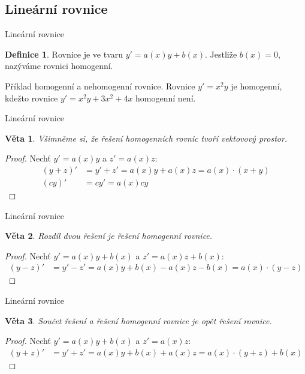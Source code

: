 \documentclass{beamer}
\newtheorem{thm}{Věta}
\theoremstyle{definition}
\newtheorem{dfn}{Definice}
\theoremstyle{example}
\begin{document}
\subsection{Lineární rovnice}
\begin{frame}{Lineární rovnice}
	\begin{dfn}
	Rovnice je ve tvaru $y' = a(x)y + b(x)$. Jestliže $b(x) = 0$, nazýváme rovnici homogenní.
	\end{dfn}
	\begin{exampleblock}{Příklad homogenní a nehomogenní rovnice.}
		Rovnice $y' = x^2y$ je homogenní, kdežto rovnice $y' = x^2y + 3x^2 + 4x$ homogenní není.
	\end{exampleblock}
\end{frame}

\begin{frame}{Lineární rovnice}
	\begin{thm}
		Všimněme si, že řešení homogenních rovnic tvoří vektovový prostor.
	\end{thm}
	\begin{proof}
		Nechť $y' = a(x)y$ a $z' = a(x)z$:
		\begin{align*}
			(y + z)' &= y' + z' = a(x)y + a(x)z = a(x) \cdot (x + y)\\
			(cy)' &= cy' = a(x)cy
		\end{align*}
	\end{proof}
\end{frame}


\begin{frame}{Lineární rovnice}
	\begin{thm}
		Rozdíl dvou řešení je řešení homogenní rovnice.
	\end{thm}
	\begin{proof}
		Nechť $y' = a(x)y + b(x)$ a $z' = a(x)z + b(x)$:
		\begin{align*}
			(y - z)' &= y' - z' = a(x)y + b(x) - a(x)z - b(x) = a(x) \cdot (y - z)
		\end{align*}
	\end{proof}
\end{frame}

\begin{frame}{Lineární rovnice}
	\begin{thm}
		Součet řešení a řešení homogenní rovnice je opět řešení rovnice.
	\end{thm}
	\begin{proof}
		Nechť $y' = a(x)y + b(x)$ a $z' = a(x)z$:
		\begin{align*}
			(y + z)' &= y' + z' = a(x)y + b(x) + a(x)z  = a(x) \cdot (y + z) + b(x)
		\end{align*}
	\end{proof}
\end{frame}
\end{document}
